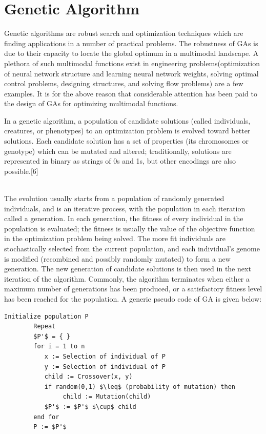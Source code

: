 \documentclass[a4paper, 12pt]{article}
\begin{document}
\section{Genetic Algorithm}
Genetic algorithms are robust search and optimization techniques which are finding applications in a number of practical problems. The robustness of GAs is due to their capacity to locate the global optimum in a multimodal landscape. A plethora of such multimodal functions exist in engineering problems(optimization of neural network structure and learning neural network weights, solving optimal control problems, designing structures, and solving flow problems) are a few examples. It is for the above reason that considerable attention has been paid to the design of GAs for optimizing multimodal functions.\\ \par
\noindent
In a genetic algorithm, a population of candidate solutions (called individuals, creatures, or phenotypes) to an optimization problem is evolved toward better solutions. Each candidate solution has a set of properties (its chromosomes or genotype) which can be mutated and altered; traditionally, solutions are represented in binary as strings of 0s and 1s, but other encodings are also possible.[6]\par
\noindent
\\The evolution usually starts from a population of randomly generated individuals, and is an iterative process, with the population in each iteration called a generation. In each generation, the fitness of every individual in the population is evaluated; the fitness is usually the value of the objective function in the optimization problem being solved. The more fit individuals are stochastically selected from the current population, and each individual's genome is modified (recombined and possibly randomly mutated) to form a new generation. The new generation of candidate solutions is then used in the next iteration of the algorithm. Commonly, the algorithm terminates when either a maximum number of generations has been produced, or a satisfactory fitness level has been reached for the population.
 A generic pseudo code of GA is given below:
\begin{lstlisting}[mathescape]
        Initialize population P
        Repeat
        $P'$ = { }
        for i = 1 to n
           x := Selection of individual of P
           y := Selection of individual of P
           child := Crossover(x, y)
           if random(0,1) $\leq$ (probability of mutation) then
                child := Mutation(child)
           $P'$ := $P'$ $\cup$ child
        end for
        P := $P'$
\end{lstlisting}
\end{document}
